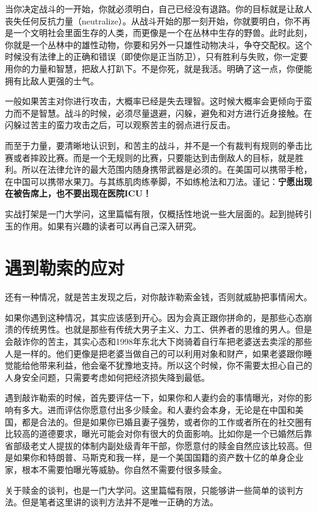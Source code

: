当你决定战斗的一开始，你就必须明白，自己已经没有退路。你的目标就是让敌人丧失任何反抗力量（neutralize）。从战斗开始的那一刻开始，你就要明白，你不再是一个文明社会里面生存的人类，而更像是一个在丛林中生存的野兽。此时此刻，你就是一个丛林中的雄性动物，你要和另外一只雄性动物决斗，争夺交配权。这个时候没有法律上的正确和错误（即使你是正当防卫），只有胜利与失败，你一定要用你的力量和智慧，把敌人打趴下。不是你死，就是我活。明确了这一点，你便能拥有比敌人更强的士气。

一般如果苦主对你进行攻击，大概率已经是失去理智。这时候大概率会更倾向于蛮力而不是智慧。战斗的时候，必须尽量退避，闪躲，避免和对方进行近身接触。在闪躲过苦主的蛮力攻击之后，可以观察苦主的弱点进行反击。

而至于力量，要清晰地认识到，和苦主的战斗，并不是一个有裁判有规则的拳击比赛或者摔跤比赛。而是一个无规则的比赛，只要能达到击倒敌人的目标，就是胜利。所以在法律允许的最大范围内随身携带武器是必须的。在美国可以携带手枪，在中国可以携带水果刀。与其练肌肉练拳脚，不如练枪法和刀法。谨记：\textbf{宁愿出现在被告席上，也不要出现在医院ICU！}

实战打架是一门大学问，这里篇幅有限，仅概括性地说一些大层面的。起到抛砖引玉的作用。如果有兴趣的读者可以再自己深入研究。

\section{遇到勒索的应对}

还有一种情况，就是苦主发现之后，对你敲诈勒索金钱，否则就威胁把事情闹大。

如果你遇到这种情况，其实应该感到开心。因为会真正跟你拼命的，是那些心态崩溃的传统男性。也就是那些有传统大男子主义、力工、供养者的思维的男人。但是会敲诈你的苦主，其实心态和1998年东北大下岗骑着自行车把老婆送去卖淫的那些人是一样的。他们更像是把老婆当做自己的可以利用对象和财产，如果老婆跟你睡觉能给他带来利益，他会毫不犹豫地支持。所以这个时候，你不需要太担心自己的人身安全问题，只需要考虑如何把经济损失降到最低。

遇到敲诈勒索的时候，首先要评估一下，如果你和人妻约会的事情曝光，对你的影响有多大。进而评估你愿意付出多少赎金。和人妻约会本身，无论是在中国和美国，都是合法的。但是如果你已婚且妻子强势，或者你的工作或者所在的社交圈有比较高的道德要求，曝光可能会对你有很大的负面影响。比如你是一个已婚然后靠省部级老丈人提拔的体制内副处级青年干部，你愿意付的赎金自然应该比较高。但是如果你和特朗普、马斯克和我一样，是一个美国国籍的资产数十亿的单身企业家，根本不需要怕曝光等威胁。你自然不需要付很多赎金。

关于赎金的谈判，也是一门大学问。这里篇幅有限，只能够讲一些简单的谈判方法。但是笔者这里讲的谈判方法并不是唯一正确的方法。

